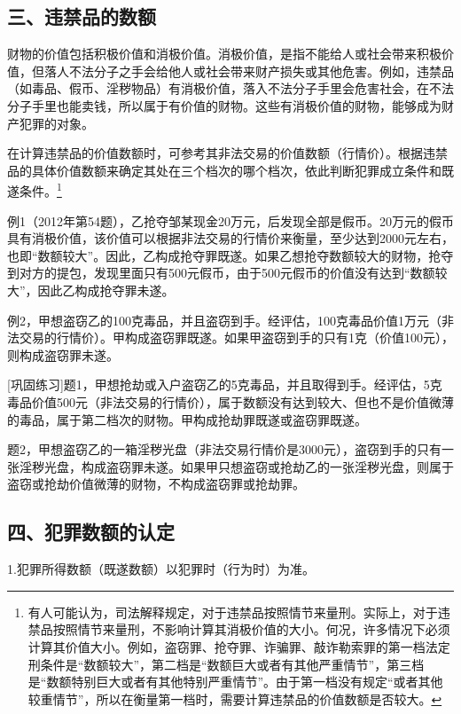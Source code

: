 \subsection*{三、违禁品的数额}

财物的价值包括积极价值和消极价值。消极价值，是指不能给人或社会带来积极价值，但落人不法分子之手会给他人或社会带来财产损失或其他危害。例如，违禁品（如毒品、假币、淫秽物品）有消极价值，落入不法分子手里会危害社会，在不法分子手里也能卖钱，所以属于有价值的财物。这些有消极价值的财物，能够成为财产犯罪的对象。

在计算违禁品的价值数额时，可参考其非法交易的价值数额（行情价）。根据违禁品的具体价值数额来确定其处在三个档次的哪个档次，依此判断犯罪成立条件和既遂条件。\footnote{有人可能认为，司法解释规定，对于违禁品按照情节来量刑。实际上，对于违禁品按照情节来量刑，不影响计算其消极价值的大小。何况，许多情况下必须计算其价值大小。例如，盗窃罪、抢夺罪、诈骗罪、敲诈勒索罪的第一档法定刑条件是“数额较大”，第二档是“数额巨大或者有其他严重情节”，第三档是“数额特别巨大或者有其他特别严重情节”。由于第一档没有规定“或者其他较重情节”，所以在衡量第一档时，需要计算违禁品的价值数额是否较大。}

例1（2012年第54题），乙抢夺邹某现金20万元，后发现全部是假币。20万元的假币具有消极价值，该价值可以根据非法交易的行情价来衡量，至少达到2000元左右，也即“数额较大”。因此，乙构成抢夺罪既遂。如果乙想抢夺数额较大的财物，抢夺到对方的提包，发现里面只有500元假币，由于500元假币的价值没有达到“数额较大”，因此乙构成抢夺罪未遂。

例2，甲想盗窃乙的100克毒品，并且盗窃到手。经评估，100克毒品价值1万元（非法交易的行情价）。甲构成盗窃罪既遂。如果甲盗窃到手的只有1克（价值100元），则构成盗窃罪未遂。

[巩固练习]题1，甲想抢劫或入户盗窃乙的5克毒品，并且取得到手。经评估，5克毒品价值500元（非法交易的行情价），属于数额没有达到较大、但也不是价值微薄的毒品，属于第二档次的财物。甲构成抢劫罪既遂或盗窃罪既遂。

题2，甲想盗窃乙的一箱淫秽光盘（非法交易行情价是3000元），盗窃到手的只有一张淫秽光盘，构成盗窃罪未遂。如果甲只想盗窃或抢劫乙的一张淫秽光盘，则属于盗窃或抢劫价值微薄的财物，不构成盗窃罪或抢劫罪。

\subsection*{四、犯罪数额的认定}

1.犯罪所得数额（既遂数额）以犯罪时（行为时）为准。

